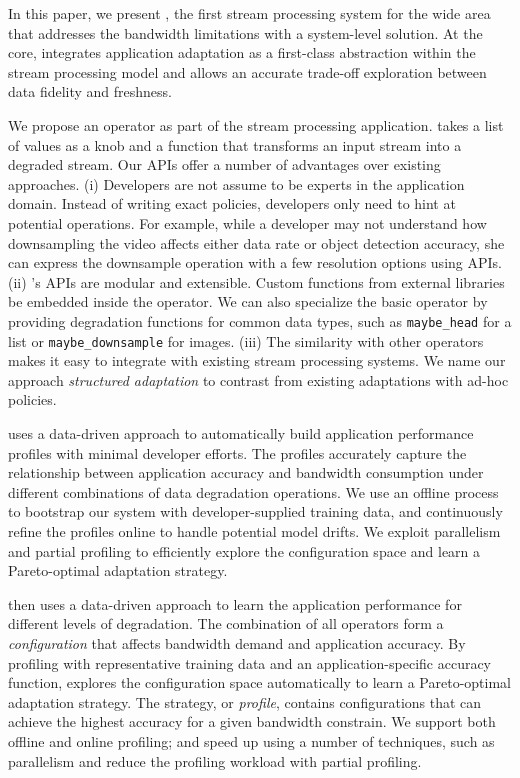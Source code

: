 In this paper, we present \sysname{}, the first stream processing system for the
wide area that addresses the bandwidth limitations with a system-level
solution. At the core, \sysname{} integrates application adaptation as a
first-class abstraction within the stream processing model and allows an
accurate trade-off exploration between data fidelity and freshness.

We propose an \maybe{} operator as part of the stream processing
application. \maybe{} takes a list of values as a knob and a function that
transforms an input stream into a degraded stream. Our APIs offer a number of
advantages over existing approaches. (i) Developers are not assume to be experts
in the application domain. Instead of writing exact policies, developers only
need to hint at potential operations. For example, while a developer may not
understand how downsampling the video affects either data rate or object
detection accuracy, she can express the downsample operation with a few
resolution options using \maybe APIs. (ii) \sysname{}'s APIs are modular and
extensible. Custom functions from external libraries be embedded inside the
operator. We can also specialize the basic operator by providing degradation
functions for common data types, such as \texttt{maybe\_head} for a list or
\texttt{maybe\_downsample} for images.  (iii) The similarity with other
operators makes it easy to integrate with existing stream processing systems.
We name our approach \textit{structured adaptation} to contrast from existing
adaptations with ad-hoc policies.


\sysname{} uses a data-driven approach to automatically build application
performance profiles with minimal developer efforts. The profiles accurately
capture the relationship between application accuracy and bandwidth consumption
under different combinations of data degradation operations. We use an offline
process to bootstrap our system with developer-supplied training data, and
continuously refine the profiles online to handle potential model drifts. We
exploit parallelism and partial profiling to efficiently explore the
configuration space and learn a Pareto-optimal adaptation strategy.




\sysname{} then uses a data-driven approach to learn the application performance
for different levels of degradation. The combination of all \maybe{} operators
form a \textit{configuration} that affects bandwidth demand and application
accuracy. By profiling with representative training data and an
application-specific accuracy function, \sysname{} explores the configuration
space automatically to learn a Pareto-optimal adaptation strategy. The strategy,
or \textit{profile}, contains configurations that can achieve the highest
accuracy for a given bandwidth constrain. We support both offline and online
profiling; and speed up using a number of techniques, such as parallelism and
reduce the profiling workload with partial profiling.

